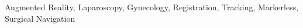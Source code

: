 \documentclass[journal]{IEEEtran}
\begin{document}
\begin{IEEEkeywords}
Augmented Reality, Laparoscopy, Gynecology, Registration, Tracking, Markerless, Surgical Navigation
\end{IEEEkeywords}



%
\IEEEpeerreviewmaketitle













\end{document}
